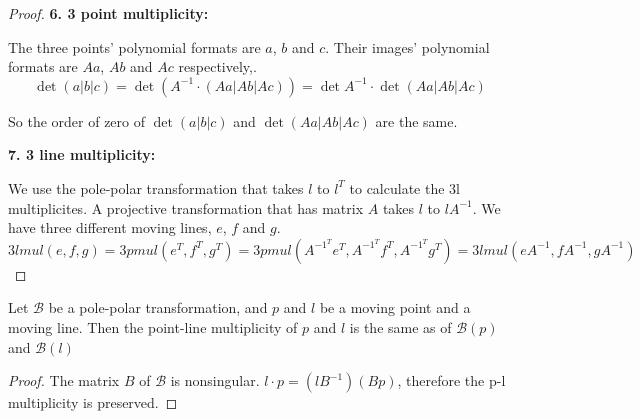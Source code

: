 \documentclass[a4paper]{article}
\begin{document}
\begin{proof}
    \textbf{6. 3 point multiplicity:}

    The three points' polynomial formats are $a$, $b$ and $c$. Their images' polynomial formats are $Aa$, $Ab$ and $Ac$ respectively,.
    $$\det(a|b|c)=\det (A^{-1}\cdot (Aa|Ab|Ac))=\det A^{-1}\cdot \det (Aa|Ab|Ac)$$

    So the order of zero of $\det(a|b|c)$ and $\det(Aa|Ab|Ac)$ are the same.

    \textbf{7. 3 line multiplicity:}

    We use the pole-polar transformation that takes $l$ to $l^T$ to calculate the 3l multiplicites. A projective transformation that has matrix $A$ takes $l$ to $lA^{-1}$. We have three different moving lines, $e$, $f$ and $g$.  $$3lmul(e,f,g)=3pmul(e^T,f^T,g^T)=3pmul(A^{-1^T}e^T,A^{-1^T}f^T,A^{-1^T}g^T)=3lmul(eA^{-1},fA^{-1},gA^{-1})$$

\end{proof}

\begin{lemma}\label{polepolar mul}
    Let $\mathcal{B}$ be a pole-polar transformation, and $p$ and $l$ be a moving point and a moving line. Then the point-line multiplicity of $p$ and $l$ is the same as of $\mathcal{B}(p)$ and $\mathcal{B}(l)$
\end{lemma}
\begin{proof}
    The matrix $B$ of $\mathcal{B}$ is nonsingular. $l\cdot p=(lB^{-1})(Bp)$, therefore the p-l multiplicity is preserved.
\end{proof}







\end{document}
